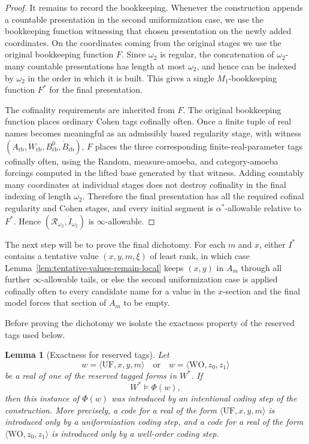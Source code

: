 \documentclass[a4paper,11pt]{article}
\newtheorem{lemma}[theorem]{Lemma}
\begin{document}
\begin{proof}
It remains to record the bookkeeping.  Whenever the construction appends a
countable presentation in the second uniformization case, we use the
bookkeeping function witnessing that chosen presentation on the newly added
coordinates.  On the coordinates coming from the original stages we use the
original bookkeeping function \(F\).  Since \(\omega_2\) is regular, the
concatenation of \(\omega_2\)-many countable presentations has length at most
\(\omega_2\), and hence can be indexed by \(\omega_2\) in the order in which it
is built.  This gives a single \(M_1\)-bookkeeping function \(F^\ast\) for the
final presentation.

The cofinality requirements are inherited from \(F\).  The original bookkeeping
function places ordinary Cohen tags cofinally often.  Once a finite tuple of real names becomes meaningful as an admissibly based
regularity stage, with witness
\((A_{\mathrm{rb}},\dot W_{\mathrm{rb}},B^0_{\mathrm{rb}},\dot B_{\mathrm{rb}})\),
\(F\) places the three corresponding finite-real-parameter tags cofinally often,
using the Random, measure-amoeba, and category-amoeba forcings computed in the
lifted base generated by that witness.  Adding
countably many coordinates at individual stages does not destroy cofinality in
the final indexing of length \(\omega_2\).  Therefore the final presentation has
all the required cofinal regularity and Cohen stages, and every initial segment
is \(\alpha^\ast\)-allowable relative to \(F^\ast\).  Hence
\((\mathcal R_{\omega_2},\dot I_{\omega_2})\) is \(\infty\)-allowable.
\end{proof}



The next step will be to prove the final dichotomy.  For each $m$ and $x$, either $I^\ast$ contains a tentative value $(x,y,m,\xi)$ of least rank, in which case Lemma~\ref{lem:tentative-values-remain-local} keeps $(x,y)$ in $A_m$ through all further $\infty$-allowable tails, or else the second uniformization case is applied cofinally often to every candidate name for a value in the $x$-section and the final model forces that section of $A_m$ to be empty.

Before proving the dichotomy we isolate the exactness property of the reserved tags used below.


\begin{lemma}[Exactness for reserved tags]\label{lem:reserved-tag-coding-exactness}
Let
\[
   w=\langle\mathrm{UF},x,y,m\rangle
   \quad\text{or}\quad
   w=\langle\mathrm{WO},z_0,z_1\rangle
\]
be a real of one of the reserved tagged forms in \(W^\ast\).  If
\[
   W^\ast\models\Phi(w),
\]
then this instance of \(\Phi(w)\) was introduced by an intentional coding step of
 the construction.  More precisely, a code for a real of the form
\(\langle\mathrm{UF},x,y,m\rangle\) is introduced only by a uniformization
coding step, and a code for a real of the form
\(\langle\mathrm{WO},z_0,z_1\rangle\) is introduced only by a well-order coding
step.
\end{lemma}
\end{document}
